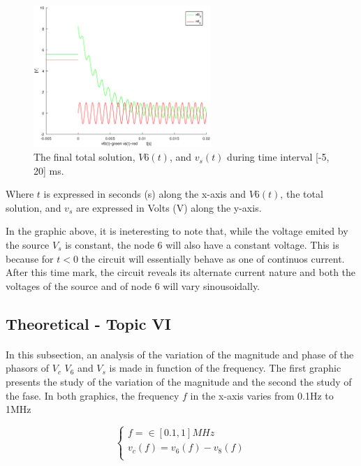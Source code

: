 \begin{figure}[H] \centering
\includegraphics[width=0.6\textwidth]{total.eps}
\caption{The final total solution, $V6(t)$,  and $v_s(t)$ during time interval [-5, 20] ms.}
\label{fig:theo_fifth}
\end{figure}


Where $t$ is expressed in seconds (s) along the x-axis and 
$V6(t)$, the total solution, and $v_s$ are expressed in Volts (V) along the y-axis.

In the graphic above, it is ineteresting to note that, while the voltage emited by the source $V_s$ is constant, the node 6 will also have a constant voltage. This is because for $t<0$ the circuit will essentially behave as one of continuos current. After this time mark, the circuit reveals its alternate current nature and both the voltages of the source and of node 6 will vary sinousoidally.



  

\subsection{Theoretical - Topic VI}
\label{subsec:sixth_topic}

\paragraph{}In this subsection, an analysis of the variation of the magnitude and phase of the phasors of $V_c$ $V_6$ and $V_s$ is made in function of the frequency. The first graphic presents the study of the variation of the magnitude and the second the study of the fase. In both graphics, the frequency $f$ in the x-axis varies from 0.1Hz to 1MHz


\[
\left\{\begin{matrix}
f =\in [0.1 , 1] MHz \\
v_c(f)=v_6(f)-v_8(f) \\
\end{matrix}\right.
\]


